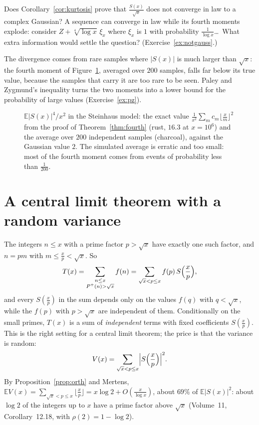 \begin{think}
Does Corollary~\ref{cor:kurtosis} prove that $\frac{S(x)}{\sqrt x}$ does not converge in law to a complex Gaussian? A sequence can converge in law while its fourth moments explode: consider $Z+\sqrt[4]{\log x}\,\xi_x$ where $\xi_x$ is $1$ with probability $\frac1{\log x}$\ldots\ What extra information would settle the question? (Exercise~\ref{ex:notgauss}.)
\end{think}

The divergence comes from rare samples where $|S(x)|$ is much larger than $\sqrt x$: the fourth moment of Figure~\ref{fig:fourth}, averaged over $200$ samples, falls far below its true value, because the samples that carry it are too rare to be seen. Paley and Zygmund's inequality turns the two moments into a lower bound for the probability of large values (Exercise~\ref{ex:pz}).

\begin{figure}[ht]
\centering{}
\caption{$\mathbb E|S(x)|^4/x^2$ in the Steinhaus model: the exact value $\frac1{x^2}\sum_mc_m\lfloor\frac xm\rfloor^2$ from the proof of Theorem~\ref{thm:fourth} (rust, $16.3$ at $x=10^6$) and the average over $200$ independent samples (charcoal), against the Gaussian value $2$. The simulated average is erratic and too small: most of the fourth moment comes from events of probability less than $\frac1{200}$.}
\label{fig:fourth}
\end{figure}

\section{A central limit theorem with a random variance}\label{sec:condclt}

The integers $n\le x$ with a prime factor $p>\sqrt x$ have exactly one such factor, and $n=pm$ with $m\le\frac xp<\sqrt x$. So
\begin{equation}\label{eq:largeprime}
T(x)=\sum_{\substack{n\le x\\P^+(n)>\sqrt x}}f(n)=\sum_{\sqrt x<p\le x}f(p)\,S\Bigl(\frac xp\Bigr),
\end{equation}
and every $S(\frac xp)$ in the sum depends only on the values $f(q)$ with $q<\sqrt x$, while the $f(p)$ with $p>\sqrt x$ are independent of them. Conditionally on the small primes, $T(x)$ is a sum of \emph{independent} terms with fixed coefficients $S(\frac xp)$. This is the right setting for a central limit theorem; the price is that the variance is random:
\[
V(x)=\sum_{\sqrt x<p\le x}\Bigl|S\Bigl(\frac xp\Bigr)\Bigr|^2.
\]
By Proposition~\ref{prop:orth} and Mertens, $\mathbb EV(x)=\sum_{\sqrt x<p\le x}\lfloor\frac xp\rfloor=x\log2+O(\frac x{\log x})$, about $69\%$ of $\mathbb E|S(x)|^2$: about $\log2$ of the integers up to $x$ have a prime factor above $\sqrt x$ (Volume~11, Corollary~12.18, with $\rho(2)=1-\log2$).

